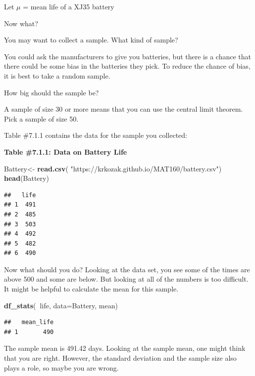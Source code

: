 \documentclass[
]{book}
\newenvironment{Shaded}{\begin{snugshade}}{\end{snugshade}}
\newcommand{\DataTypeTok}[1]{\textcolor[rgb]{0.13,0.29,0.53}{#1}}
\newcommand{\KeywordTok}[1]{\textcolor[rgb]{0.13,0.29,0.53}{\textbf{#1}}}
\newcommand{\NormalTok}[1]{#1}
\newcommand{\OperatorTok}[1]{\textcolor[rgb]{0.81,0.36,0.00}{\textbf{#1}}}
\newcommand{\StringTok}[1]{\textcolor[rgb]{0.31,0.60,0.02}{#1}}
\begin{document}
Let \(\mu\) = mean life of a XJ35 battery

Now what?

You may want to collect a sample. What kind of sample?

You could ask the manufacturers to give you batteries, but there is a chance that there could be some bias in the batteries they pick. To reduce the chance of bias, it is best to take a random sample.

How big should the sample be?

A sample of size 30 or more means that you can use the central limit theorem. Pick a sample of size 50.

Table \#7.1.1 contains the data for the sample you collected:

\textbf{Table \#7.1.1: Data on Battery Life}

\begin{Shaded}
\begin{Highlighting}[]
\NormalTok{Battery<-}\StringTok{ }\KeywordTok{read.csv}\NormalTok{(}
  \StringTok{"https://krkozak.github.io/MAT160/battery.csv"}\NormalTok{)}
\KeywordTok{head}\NormalTok{(Battery)}
\end{Highlighting}
\end{Shaded}

\begin{verbatim}
##   life
## 1  491
## 2  485
## 3  503
## 4  492
## 5  482
## 6  490
\end{verbatim}

Now what should you do? Looking at the data set, you see some of the times are above 500 and some are below. But looking at all of the numbers is too difficult. It might be helpful to calculate the mean for this sample.

\begin{Shaded}
\begin{Highlighting}[]
\KeywordTok{df_stats}\NormalTok{(}\OperatorTok{~}\NormalTok{life, }\DataTypeTok{data=}\NormalTok{Battery, mean)}
\end{Highlighting}
\end{Shaded}

\begin{verbatim}
##   mean_life
## 1       490
\end{verbatim}

The sample mean is 491.42 days. Looking at the sample mean, one might think that you are right. However, the standard deviation and the sample size also plays a role, so maybe you are wrong.
\end{document}
